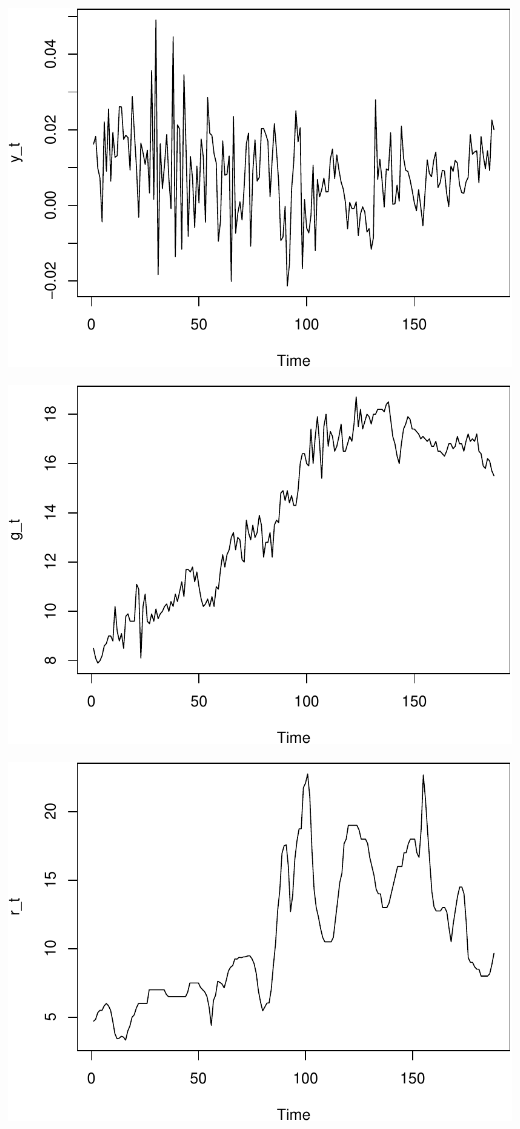 \documentclass[11pt,preprint, authoryear]{elsarticle}
\numberwithin{equation}{section}
\numberwithin{figure}{section}
\numberwithin{table}{section}
\begin{document}
\includegraphics{TS_proj_files/figure-latex/unnamed-chunk-9-1.pdf}

\includegraphics{TS_proj_files/figure-latex/unnamed-chunk-10-1.pdf}

\includegraphics{TS_proj_files/figure-latex/unnamed-chunk-11-1.pdf}
\end{document}
